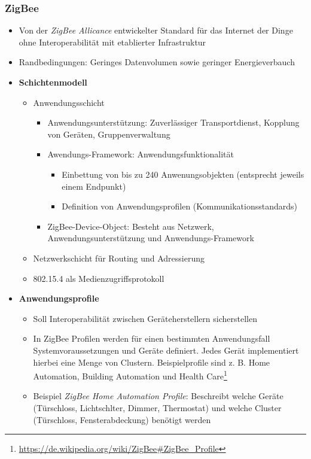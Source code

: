 \subsubsection{ZigBee}
\begin{itemize}
	\item Von der \textit{ZigBee Allicance} entwickelter Standard für das Internet der Dinge ohne Interoperabilität mit etablierter Infrastruktur
	\item Randbedingungen: Geringes Datenvolumen sowie geringer Energieverbauch
	\item \textbf{Schichtenmodell}
	\begin{itemize}
		\item Anwendungsschicht
		\begin{itemize}
			\item Anwendungsunterstützung: Zuverlässiger Transportdienst, Kopplung von Geräten, Gruppenverwaltung
			\item Awendungs-Framework: Anwendungsfunktionalität
			\begin{itemize}
				\item Einbettung von bis zu 240 Anwenungsobjekten (entsprecht jeweils einem Endpunkt)
				\item Definition von Anwendungsprofilen (Kommunikationsstandards)
			\end{itemize}
			\item ZigBee-Device-Object: Besteht aus Netzwerk, Anwendungsunterstützung und Anwendungs-Framework
		\end{itemize}
		\item Netzwerkschicht für Routing und Adressierung
		\item 802.15.4 als Medienzugriffsprotokoll
	\end{itemize}
	\item \textbf{Anwendungsprofile}
	\begin{itemize}
		\item Soll Interoperabilität zwischen Geräteherstellern sicherstellen
		\item In ZigBee Profilen werden für einen bestimmten Anwendungsfall Systemvoraussetzungen und Geräte definiert. Jedes Gerät implementiert hierbei eine Menge von Clustern. Beispielprofile sind z. B. Home Automation, Building Automation und Health Care\footnote{\url{https://de.wikipedia.org/wiki/ZigBee\#ZigBee_Profile}}
		\item Beispiel \textit{ZigBee Home Automation Profile}: Beschreibt welche Geräte (Türschloss, Lichtschlter, Dimmer, Thermostat) und welche Cluster (Türschloss, Fensterabdeckung) benötigt werden

\end{itemize}
\end{itemize}
